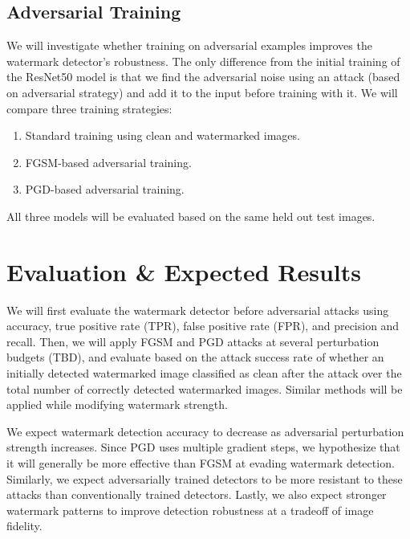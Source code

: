\documentclass[sigconf, nonacm]{acmart}
\begin{document}
\subsection{Adversarial Training}
We will investigate whether training on adversarial examples improves the watermark detector's robustness. The only difference from the initial training of the ResNet50 model is that we find the adversarial noise using an attack (based on adversarial strategy) and add it to the input before training with it. We will compare three training strategies:
\begin{enumerate}
    \item Standard training using clean and watermarked images.
    \item FGSM-based adversarial training.
    \item PGD-based adversarial training.
\end{enumerate}
All three models will be evaluated based on the same held out test images.

\section{Evaluation \& Expected Results}
We will first evaluate the watermark detector before adversarial attacks using accuracy, true positive rate (TPR), false positive rate (FPR), and precision and recall. Then, we will apply FGSM and PGD attacks at several perturbation budgets (TBD), and evaluate based on the attack success rate of whether an initially detected watermarked image classified as clean after the attack over the total number of correctly detected watermarked images. Similar methods will be applied while modifying watermark strength.

We expect watermark detection accuracy to decrease as adversarial perturbation strength increases. Since PGD uses multiple gradient steps, we hypothesize that it will generally be more effective than FGSM at evading watermark detection. Similarly, we expect adversarially trained detectors to be more resistant to these attacks than conventionally trained detectors. Lastly, we also expect stronger watermark patterns to improve detection robustness at a tradeoff of image fidelity. 
\end{document}
